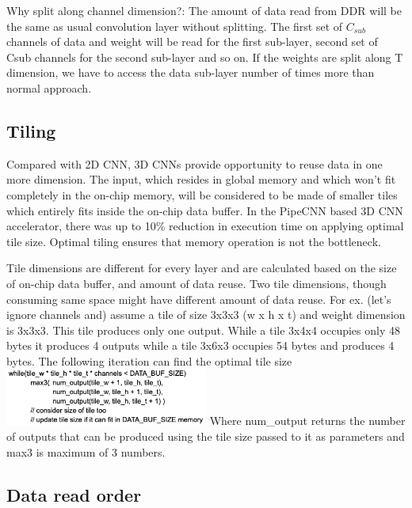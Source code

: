 \documentclass[conference]{IEEEtran}
\begin{document}
Why split along channel dimension?: The amount of data read from DDR will be the same as usual convolution layer without splitting. The first set of $C_{sub}$ channels of data and weight will be read for the first sub-layer, second set of Csub channels for the second sub-layer and so on. If the weights are split along T dimension, we have to access the data sub-layer number of times more than normal approach.

\subsection{Tiling}\label{AA}
Compared with 2D CNN, 3D CNNs provide opportunity to reuse data in one more dimension. The input, which resides in global memory and which won’t fit completely in the on-chip memory, will be considered to be made of smaller tiles which entirely fits inside the on-chip data buffer. In the PipeCNN based 3D CNN accelerator, there was up to 10\% reduction in execution time on applying optimal tile size. Optimal tiling ensures that memory operation is not the bottleneck.

Tile dimensions are different for every layer and are calculated based on the size of on-chip data buffer, and amount of data reuse. Two tile dimensions, though consuming same space might have different amount of data reuse. For ex. (let’s ignore channels and) assume a tile of size 3x3x3 (w x h x t) and weight dimension is 3x3x3. This tile produces only one output. While a tile 3x4x4 occupies only 48 bytes it produces 4 outputs while a tile 3x6x3 occupies 54 bytes and produces 4 bytes. The following iteration can find the optimal tile size
\newline
\newline
\includegraphics[width=0.5\textwidth]{tiling_snippet}
\newline
\newline
Where num\_output returns the number of outputs that can be produced using the tile size passed to it as parameters and max3 is maximum of 3 numbers. 

\subsection{Data read order}\label{AA}
\end{document}

